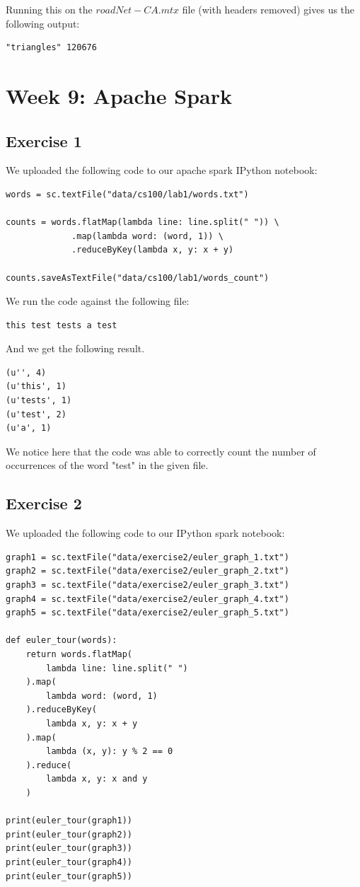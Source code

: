 \documentclass{article}
\begin{document}
Running this on the $roadNet-CA.mtx$ file (with headers removed) gives us the following output:

\begin{lstlisting}
"triangles"	120676
\end{lstlisting}

\section{Week 9: Apache Spark}

\subsection{Exercise 1}
\label{sub:Exercise 1}

We uploaded the following code to our apache spark IPython notebook:

\begin{lstlisting}
words = sc.textFile("data/cs100/lab1/words.txt")

counts = words.flatMap(lambda line: line.split(" ")) \
             .map(lambda word: (word, 1)) \
             .reduceByKey(lambda x, y: x + y)

counts.saveAsTextFile("data/cs100/lab1/words_count")
\end{lstlisting}

We run the code against the following file:

\begin{lstlisting}
this test tests a test
\end{lstlisting}

And we get the following result.

\begin{lstlisting}
(u'', 4)
(u'this', 1)
(u'tests', 1)
(u'test', 2)
(u'a', 1)
\end{lstlisting}

We notice here that the code was able to correctly count the number of occurrences of the word "test" in the given file.

\subsection{Exercise 2}
\label{sub:Exercise 2}

We uploaded the following code to our IPython spark notebook:

\begin{lstlisting}
graph1 = sc.textFile("data/exercise2/euler_graph_1.txt")
graph2 = sc.textFile("data/exercise2/euler_graph_2.txt")
graph3 = sc.textFile("data/exercise2/euler_graph_3.txt")
graph4 = sc.textFile("data/exercise2/euler_graph_4.txt")
graph5 = sc.textFile("data/exercise2/euler_graph_5.txt")

def euler_tour(words):
    return words.flatMap(
        lambda line: line.split(" ")
    ).map(
        lambda word: (word, 1)
    ).reduceByKey(
        lambda x, y: x + y
    ).map(
        lambda (x, y): y % 2 == 0
    ).reduce(
        lambda x, y: x and y
    )

print(euler_tour(graph1))
print(euler_tour(graph2))
print(euler_tour(graph3))
print(euler_tour(graph4))
print(euler_tour(graph5))
\end{lstlisting}
\end{document}
